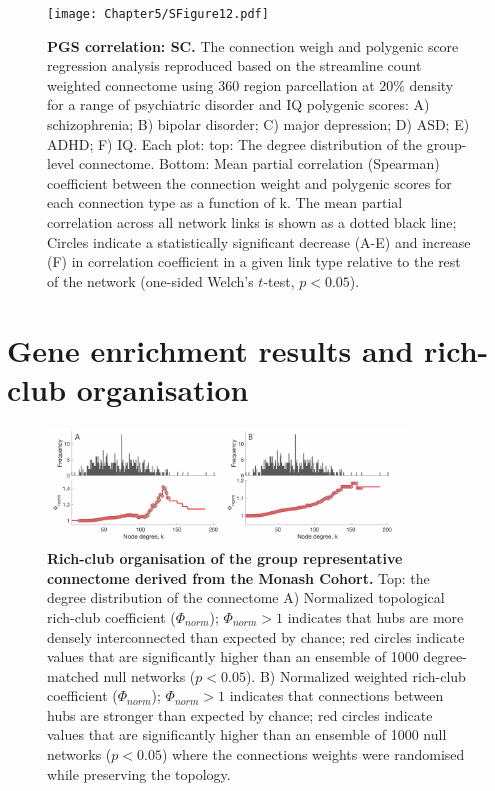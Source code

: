 \begin{figure}[h!]
\begin{center}
\texttt{[image: Chapter5/SFigure12.pdf]}%
\end{center}
\caption{\textbf{PGS correlation: SC.}
The connection weigh and polygenic score regression analysis reproduced based on the streamline count weighted connectome using 360 region parcellation at $20\%$ density for a range of psychiatric disorder and IQ polygenic scores: A) schizophrenia; B) bipolar disorder; C) major depression; D) ASD; E) ADHD; F) IQ. Each plot: top: The degree distribution of the group-level connectome. Bottom: Mean partial correlation (Spearman) coefficient between the connection weight and polygenic scores for each connection type as a function of k. The mean partial correlation across all network links is shown as a dotted black line; Circles indicate a statistically significant decrease (A-E) and increase (F) in correlation coefficient in a given link type relative to the rest of the network (one-sided Welch's $t$-test, $p < 0.05$). }
\label{fig:Ch5SFig12}
\end{figure}

\clearpage
\section{Gene enrichment results and rich-club organisation}
\label{app:AppendixCh5_3}

\begin{figure}[h!]
\begin{center}
\includegraphics[width=0.85\textwidth]{Chapter5/SFigure13.pdf}%
\end{center}
\caption{\textbf{Rich-club organisation of the group representative connectome derived from the Monash Cohort.} Top: the degree distribution of the connectome A) Normalized topological rich-club coefficient ($\Phi_{norm}$); $\Phi_{norm}>1$ indicates that hubs are more densely interconnected than expected by chance; red circles indicate values that are significantly higher than an ensemble of 1000 degree-matched null networks ($p<0.05$). B) Normalized weighted rich-club coefficient ($\Phi_{norm}$); $\Phi_{norm}>1$ indicates that connections between hubs are stronger than expected by chance; red circles indicate values that are significantly higher than an ensemble of 1000 null networks ($p<0.05$) where the connections weights were randomised while preserving the topology. }
\label{fig:Ch5SFig13}
\end{figure}

